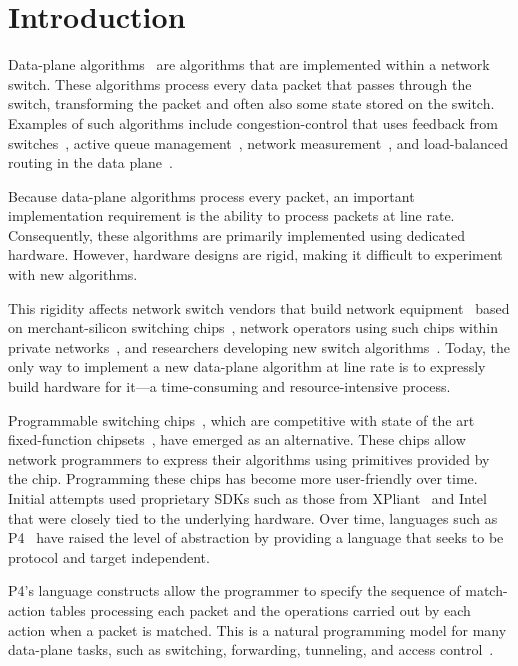 \section{Introduction}
\label{s:intro}

Data-plane algorithms~\cite{cestan} are algorithms that are implemented within
a network switch. These algorithms process every data packet that passes
through the switch, transforming the packet and often also some state stored on
the switch.  Examples of such algorithms include congestion-control that uses
feedback from switches~\cite{xcp, rcp, pdq, dctcp}, active queue
management~\cite{codel}, network measurement~\cite{opensketch, bitmap_george,
elephant_george}, and load-balanced routing in the data plane~\cite{conga}.

Because data-plane algorithms process every packet, an important implementation
requirement is the ability to process packets at line rate.  Consequently,
these algorithms are primarily implemented using dedicated hardware. However,
hardware designs are rigid, making it difficult to experiment with new
algorithms.

This rigidity affects network switch vendors that build network
equipment~\cite{cisco_nexus, dell_force10, arista_7050} based on
merchant-silicon switching chips~\cite{trident, tomahawk, mellanox}, network
operators using such chips within private networks~\cite{google,facebook,vl2},
and researchers developing new switch algorithms~\cite{xcp, codel, d3, detail,
pdq}. Today, the only way to implement a new data-plane algorithm at line rate
is to expressly build hardware for it---a time-consuming and resource-intensive
process.

Programmable switching chips~\cite{flexpipe, xpliant, rmt}, which are
competitive with state of the art fixed-function chipsets~\cite{trident,
tomahawk, mellanox}, have emerged as an alternative.  These chips allow network
programmers to express their algorithms using primitives provided by the chip.
Programming these chips has become more user-friendly over time. Initial
attempts used proprietary SDKs such as those from XPliant~\cite{xpliant_sdk,
xpliant_sdk2} and Intel~\cite{intel_sdk} that were closely tied to the
underlying hardware.  Over time, languages such as P4~\cite{p4, p4spec} have
raised the level of abstraction by providing a language that seeks to be
protocol and target independent.

P4's language constructs allow the programmer to specify the sequence of
match-action tables processing each packet and the operations carried out
by each action when a packet is matched. This is a natural programming
model for many data-plane tasks, such as switching, forwarding, tunneling, and
access control~\cite{dc_p4}.

